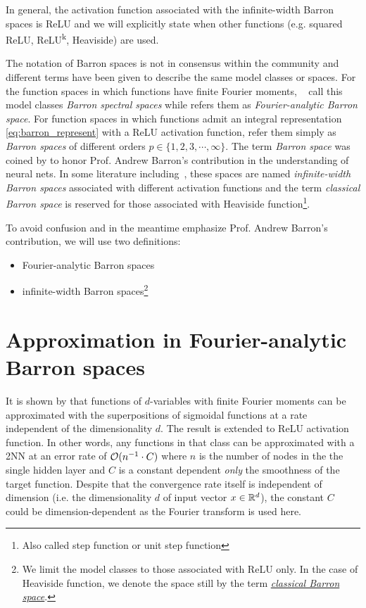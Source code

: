\TODO

In general, the activation function associated with the infinite-width Barron
spaces is ReLU and we will explicitly state when other functions (e.g. squared
ReLU, ReLU\textsuperscript{k}, Heaviside) are used.

The notation of Barron spaces is not in consensus within the community and
different terms have been given to describe the same model classes or spaces.
For the function spaces in which functions have finite Fourier moments,
~\cite{xuFiniteNeuronMethod2020} call this model classes \textit{Barron spectral
spaces} while \cite{carageaNeuralNetworkApproximation2022} refers them as
\textit{Fourier-analytic Barron space}.  For function spaces in which functions
admit an integral representation \eqref{eq:barron_represent} with a ReLU
activation function, \cite{eBarronSpaceFlowinduced2021} refer them simply as
\textit{Barron spaces} of different orders $p \in \{1, 2, 3, \cdots, \infty\}$.
The term \textit{Barron space} was coined by
\cite{ePrioriEstimatesPopulation2019} to honor Prof. Andrew Barron's
contribution in the understanding of neural nets. In some literature
including~\cite{carageaNeuralNetworkApproximation2022}, these spaces are named
\textit{infinite-width Barron spaces} associated with different activation
functions and the term \textit{classical Barron space} is reserved for those
associated with Heaviside function\footnote{Also called step function or unit
step function}.

To avoid confusion and in the meantime emphasize Prof. Andrew Barron's
contribution, we will use two definitions:
\begin{itemize}
    \item Fourier-analytic Barron spaces
    \item infinite-width Barron spaces\footnote{
        We limit the model classes to those associated with ReLU only. In the 
        case of Heaviside function, we denote the space still by the term 
        \hyperref[def:heaviside_space]{\textit{classical Barron space}}.
    }
\end{itemize}


\section{Approximation in Fourier-analytic Barron spaces}
\label{sec:approximation_fouier}

It is shown by \cite{barronUniversalApproximationBounds1993} that functions of
$d$-variables with finite Fourier moments can be approximated with the
superpositions of sigmoidal functions at a rate independent of the
dimensionality $d$. The result is extended to ReLU activation function. In other
words, any functions in that class can be approximated with a 2NN at an error
rate of $\mathcal{O}(n^{-1} \cdot C)$ where $n$ is the number of nodes in the the
single hidden layer and $C$ is a constant dependent \textit{only} the smoothness
of the target function. Despite that the convergence rate itself is independent
of dimension (i.e. the dimensionality $d$ of input vector $x\in\mathbb{R}^d$), the
constant $C$ could be dimension-dependent as the Fourier transform is used here.

